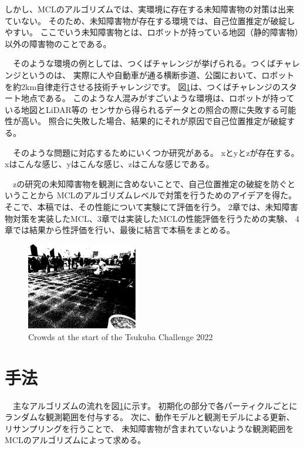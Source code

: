 \documentclass{jarticle}
\begin{document}
しかし、MCLのアルゴリズムでは、実環境に存在する未知障害物の対策は出来ていない。
そのため、未知障害物が存在する環境では、自己位置推定が破綻しやすい。
ここでいう未知障害物とは、ロボットが持っている地図（静的障害物）以外の障害物のことである。

　そのような環境の例としては、つくばチャレンジ\cite{つくばチャレンジ}が挙げられる。つくばチャレンジというのは、
実際に人や自動車が通る横断歩道、公園において、ロボットを約2km自律走行させる技術チャレンジです。
図\ref{fig: つくばチャレンジ人混み}は、つくばチャレンジのスタート地点である。
このような人混みがすごいような環境は、ロボットが持っている地図とLiDAR等の
センサから得られるデータとの照合の際に失敗する可能性が高い。
照合に失敗した場合、結果的にそれが原因で自己位置推定が破綻する。

　そのような問題に対応するためにいくつか研究がある。
xとyとzが存在する。xはこんな感じ、yはこんな感じ、zはこんな感じである。

　zの研究の未知障害物を観測に含めないことで、自己位置推定の破綻を防ぐということから
MCLのアルゴリズムレベルで対策を行うためのアイデアを得た。
そこで、本稿では、その性能について実験にて評価を行う。
2章では、未知障害物対策を実装したMCL、3章では実装したMCLの性能評価を行うための実験、
4章では結果から性評価を行い、最後に結言で本稿をまとめる。

\begin{figure}[h]
  \centering
   \includegraphics[height=38mm]{fig/hitogomi.eps}
   \vspace*{-4mm}
   \caption{Crowds at the start of the Tsukuba Challenge 2022}
   \label{fig: つくばチャレンジ人混み}
 \end{figure}

\section{手法}%

　主なアルゴリズムの流れを図\ref{fig: つくばチャレンジ人混み}に示す。
初期化の部分で各パーティクルごとにランダムな観測範囲を付与する。
次に、動作モデルと観測モデルによる更新、リサンプリングを行うことで、
未知障害物が含まれていないような観測範囲をMCLのアルゴリズムによって求める。
\end{document}
